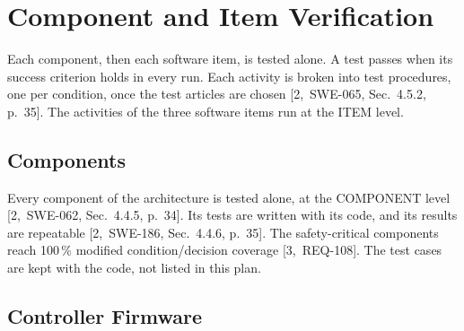 \documentclass[11pt,a4paper]{article}
\begin{document}
\section{Component and Item Verification}
Each component, then each software item, is tested alone. A test passes when
its success criterion holds in every run. Each activity is broken into test
procedures, one per condition, once the test articles are chosen
[2,~SWE-065, Sec.~4.5.2, p.~35]. The activities of the three software items run
at the ITEM level.

\subsection{Components}
Every component of the architecture is tested alone, at the COMPONENT level
[2,~SWE\mbox{-}062, Sec.~4.4.5, p.~34]. Its tests are written with its code, and its
results are repeatable [2,~SWE\mbox{-}186, Sec.~4.4.6, p.~35]. The safety-critical
components reach 100\,\% modified condition/decision coverage [3,~REQ-108].
The test cases are kept with the code, not listed in this plan.

\subsection{Controller Firmware}
\end{document}
